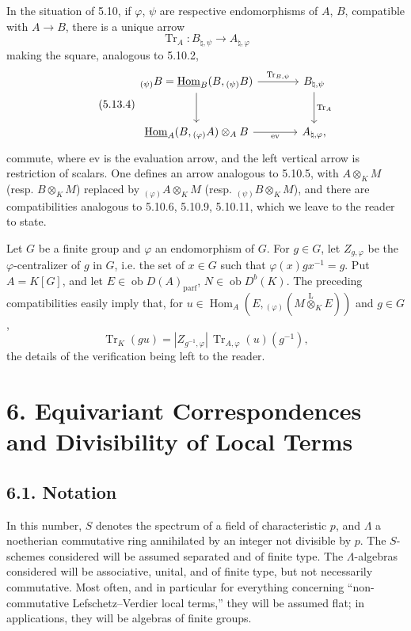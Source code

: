 \documentclass[11pt]{article}
\providecommand{\uHom}{\underline{\Hom}}
\DeclareMathOperator{\Hom}{Hom}
\newcommand{\ob}{\operatorname{ob}}
\providecommand{\Tr}{\operatorname{Tr}}
\providecommand{\Tr}{\operatorname{Tr}}
\providecommand{\lten}{\overset{\mathrm L}{\otimes}}
\providecommand{\Tr}{\operatorname{Tr}}
\providecommand{\Hom}{\operatorname{Hom}}
\providecommand{\ob}{\operatorname{ob}}
\providecommand{\lten}{\overset{\mathrm L}{\otimes}}
\providecommand{\lten}{\overset{\mathrm L}{\otimes}}
\providecommand{\Tr}{\operatorname{Tr}}
\providecommand{\lten}{\overset{\mathrm L}{\otimes}}
\providecommand{\lten}{\overset{\mathrm L}{\otimes}}
\providecommand{\lten}{\overset{\mathrm L}{\otimes}}
\providecommand{\Hom}{\operatorname{Hom}}
\providecommand{\Tr}{\operatorname{Tr}}
\providecommand{\lten}{\overset{\mathrm L}{\otimes}}
\begin{document}
In the situation of 5.10, if $\varphi$, $\psi$ are respective endomorphisms of $A$, $B$, compatible with $A\to B$, there is a unique arrow
\[
\Tr_A:B_{\natural,\psi}\longrightarrow A_{\natural,\varphi}
\]
making the square, analogous to 5.10.2,
\begin{equation}\tag{5.13.4}
\begin{tikzcd}[column sep=large,row sep=large]
{}_{(\psi)}B=\uHom_B(B,{}_{(\psi)}B) \arrow[r,"\Tr_{B,\psi}"] \arrow[d] & B_{\natural,\psi} \arrow[d,"\Tr_A"]\\
\uHom_A(B,{}_{(\varphi)}A)\otimes_AB \arrow[r,"\mathrm{ev}"'] & A_{\natural,\varphi},
\end{tikzcd}
\end{equation}
commute, where $\mathrm{ev}$ is the evaluation arrow, and the left vertical arrow is restriction of scalars. One defines an arrow analogous to 5.10.5, with $A\otimes_KM$ (resp. $B\otimes_KM$) replaced by ${}_{(\varphi)}A\otimes_KM$ (resp. ${}_{(\psi)}B\otimes_KM$), and there are compatibilities analogous to 5.10.6, 5.10.9, 5.10.11, which we leave to the reader to state.

Let $G$ be a finite group and $\varphi$ an endomorphism of $G$. For $g\in G$, let $Z_{g,\varphi}$ be the $\varphi$-centralizer of $g$ in $G$, i.e. the set of $x\in G$ such that $\varphi(x)gx^{-1}=g$. Put $A=K[G]$, and let $E\in\ob D(A)_{\mathrm{parf}}$, $N\in\ob D^b(K)$. The preceding compatibilities easily imply that, for $u\in\Hom_A(E,{}_{(\varphi)}(M\lten_KE))$ and $g\in G$,
\begin{equation}\tag{5.13.5}
\Tr_K(gu)=|Z_{g^{-1},\varphi}|\,\Tr_{A,\varphi}(u)(g^{-1}),
\end{equation}
the details of the verification being left to the reader.

\section*{6. Equivariant Correspondences and Divisibility of Local Terms}

\subsection*{6.1. Notation}

In this number, $S$ denotes the spectrum of a field of characteristic $p$, and $\Lambda$ a noetherian commutative ring annihilated by an integer not divisible by $p$. The $S$-schemes considered will be assumed separated and of finite type. The $\Lambda$-algebras considered will be associative, unital, and of finite type, but not necessarily commutative. Most often, and in particular for everything concerning “non-commutative Lefschetz--Verdier local terms,” they will be assumed flat; in applications, they will be algebras of finite groups.
\end{document}
